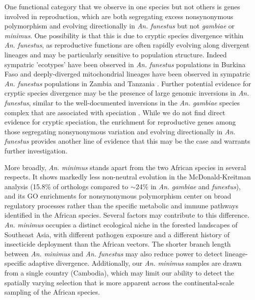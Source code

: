 One functional category that we observe in one species 
but not others is genes involved in reproduction, which are both segregating excess 
nonsynonymous polymorphism and evolving directionally in 
\textit{An. funestus} but not \textit{gambiae} or \textit{minimus}.
One possibility is that this is due to 
cryptic species divergence within \textit{An. funestus},
 as reproductive functions are often rapidly evolving along 
 divergent lineages and may be particularly sensitive to population structure.
Indeed sympatric 'ecotypes' have been observed in \textit{An. funestus} 
populations in Burkina Faso \citep{afun_eco} and deeply-diverged 
mitochondrial lineages have been observed in sympatric \textit{An. funestus}
populations in Zambia and Tanzania \citep{afun_mito}.
Further potential evidence for cryptic species divergence may be the presence 
of large genomic inversions in \textit{An. funestus},
similar to the well-documented inversions in the \textit{An. gambiae} 
species complex that are associated with speciation
\citep{funestus, gambiae}.
While we do not find direct evidence for cryptic speciation, the 
enrichment for reproductive genes among those segregating nonsynonymous variation 
and evolving directionally in \textit{An. funestus} provides another
line of evidence that this may be the case and warrants further investigation.

More broadly, \textit{An. minimus} stands apart from the two African species
in several respects.
It shows markedly less non-neutral evolution in the McDonald-Kreitman analysis
(15.8\% of orthologs compared to $\sim$24\% in \textit{An. gambiae} and \textit{funestus}),
and its GO enrichments for nonsynonymous polymorphism center on
broad regulatory processes rather than the specific metabolic and immune pathways
identified in the African species.
Several factors may contribute to this difference.
\textit{An. minimus} occupies a distinct ecological niche
in the forested landscapes of Southeast Asia,
with different pathogen exposure and a different history of insecticide deployment
than the African vectors.
The shorter branch length between \textit{An. minimus} and \textit{An. funestus}
may also reduce power to detect lineage-specific adaptive divergence.
Additionally, our \textit{An. minimus} samples are drawn from a single country (Cambodia),
which may limit our ability to detect the spatially varying selection
that is more apparent across the continental-scale sampling of the African species.

